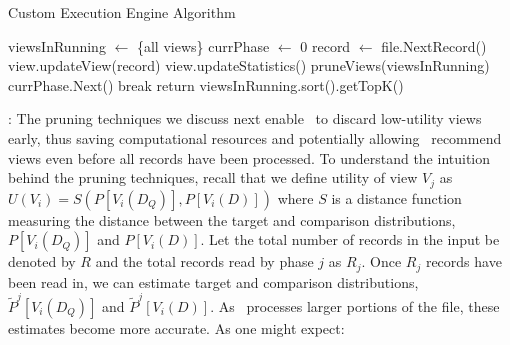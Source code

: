 \begin{algorithm}[h]
\caption{Custom Execution Engine Algorithm}
\label{algo:custom_exec_engine}
\begin{algorithmic}[1]
\State viewsInRunning $\gets$ \{all views\}
\State currPhase $\gets$ 0
\State record $\gets$ file.NextRecord()
\State view.updateView(record)
\State view.updateStatistics()
\EndFor
{}
\State pruneViews(viewsInRunning)
\State currPhase.Next()
\EndIf
{}
\State break
\EndIf
\EndWhile
\State return viewsInRunning.sort().getTopK()
\end{algorithmic}
\end{algorithm}



: The pruning techniques we discuss next enable \SeeDB\ to discard low-utility views
early, thus saving computational resources and potentially allowing \SeeDB\ recommend
views even before all records have been processed.
To understand the intuition behind the pruning techniques, recall that we define utility of
view $V_j$ as $ U (V_i) = S ( P[V_i (D_Q)], P[V_i (D)] )$ where $S$ is a distance function measuring
the distance between the target and comparison distributions, $P[V_i (D_Q)]$ and $P[V_i (D)]$.
Let the total number of records in the input be denoted by $R$ and the total records
read by phase $j$ as $R_j$. 
Once $R_j$ records have been read in, we can estimate target and comparison 
distributions, $\widetilde{P}^j[V_i (D_Q)]$ and $\widetilde{P}^j[V_i (D)]$.
As \SeeDB\ processes larger portions of the file, these estimates become more accurate. 
As one might expect:

